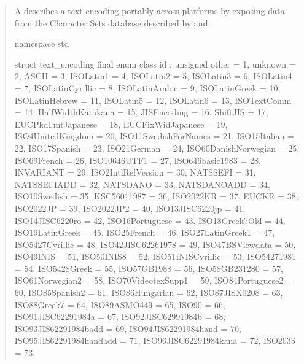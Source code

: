 \documentclass{wg21}
\begin{document}
\begin{quote}
\begin{addedblock}

A  describes a text encoding portably across platforms by exposing data from the Character Sets database described by \cite{rfc2978} and \cite{rfc3808}.

\begin{codeblock}

namespace std {

struct text_encoding final{
    enum class id : unsigned {
        other = 1,
        unknown = 2,
        ASCII = 3,
        ISOLatin1 = 4,
        ISOLatin2 = 5,
        ISOLatin3 = 6,
        ISOLatin4 = 7,
        ISOLatinCyrillic = 8,
        ISOLatinArabic = 9,
        ISOLatinGreek = 10,
        ISOLatinHebrew = 11,
        ISOLatin5 = 12,
        ISOLatin6 = 13,
        ISOTextComm = 14,
        HalfWidthKatakana = 15,
        JISEncoding = 16,
        ShiftJIS = 17,
        EUCPkdFmtJapanese = 18,
        EUCFixWidJapanese = 19,
        ISO4UnitedKingdom = 20,
        ISO11SwedishForNames = 21,
        ISO15Italian = 22,
        ISO17Spanish = 23,
        ISO21German = 24,
        ISO60DanishNorwegian = 25,
        ISO69French = 26,
        ISO10646UTF1 = 27,
        ISO646basic1983 = 28,
        INVARIANT = 29,
        ISO2IntlRefVersion = 30,
        NATSSEFI = 31,
        NATSSEFIADD = 32,
        NATSDANO = 33,
        NATSDANOADD = 34,
        ISO10Swedish = 35,
        KSC56011987 = 36,
        ISO2022KR = 37,
        EUCKR = 38,
        ISO2022JP = 39,
        ISO2022JP2 = 40,
        ISO13JISC6220jp = 41,
        ISO14JISC6220ro = 42,
        ISO16Portuguese = 43,
        ISO18Greek7Old = 44,
        ISO19LatinGreek = 45,
        ISO25French = 46,
        ISO27LatinGreek1 = 47,
        ISO5427Cyrillic = 48,
        ISO42JISC62261978 = 49,
        ISO47BSViewdata = 50,
        ISO49INIS = 51,
        ISO50INIS8 = 52,
        ISO51INISCyrillic = 53,
        ISO54271981 = 54,
        ISO5428Greek = 55,
        ISO57GB1988 = 56,
        ISO58GB231280 = 57,
        ISO61Norwegian2 = 58,
        ISO70VideotexSupp1 = 59,
        ISO84Portuguese2 = 60,
        ISO85Spanish2 = 61,
        ISO86Hungarian = 62,
        ISO87JISX0208 = 63,
        ISO88Greek7 = 64,
        ISO89ASMO449 = 65,
        ISO90 = 66,
        ISO91JISC62291984a = 67,
        ISO92JISC62991984b = 68,
        ISO93JIS62291984badd = 69,
        ISO94JIS62291984hand = 70,
        ISO95JIS62291984handadd = 71,
        ISO96JISC62291984kana = 72,
        ISO2033 = 73,
}}}
\end{codeblock}
\end{addedblock}
\end{quote}
\end{document}

